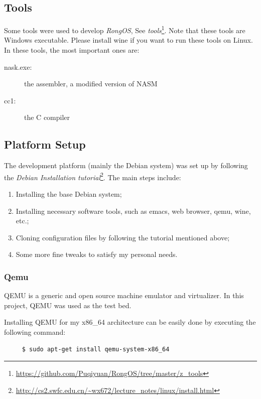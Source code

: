 \documentclass{swfcthesis}
\begin{document}
\subsection{Tools}

Some tools were used to develop \emph{RongOS}, See \emph{tools}\footnote{\url{https://github.com/Puqiyuan/RongOS/tree/master/z_tools}}. Note that
these tools are Windows executable. Please install wine if you want to run these tools on
Linux. In these tools, the most important ones are:

\begin{description}
\item[nask.exe:] the assembler, a modified version of NASM\cite{30_os}
\item[cc1:] the C compiler
\end{description}

\subsection{Platform Setup}

The development platform (mainly the Debian system) was set up by following the
\emph{Debian Installation
  tutorial}\footnote{\url{http://cs2.swfc.edu.cn/~wx672/lecture_notes/linux/install.html}}. The
main steps include:
\begin{enumerate}
\item Installing the base Debian system;
\item Installing necessary software tools, such as emacs, web browser, qemu, wine, etc.;
\item Cloning configuration files by following the tutorial mentioned above;
\item Some more fine tweaks to satisfy my personal needs.
\end{enumerate}

\subsubsection{Qemu}

QEMU is a generic and open source machine emulator and virtualizer\cite{wiki:qemu}. In
this project, QEMU was used as the test bed.

Installing QEMU for my x86\_64 architecture can be easily done by executing the following
command:
\begin{verbatim}
     $ sudo apt-get install qemu-system-x86_64
\end{verbatim}
\end{document}
